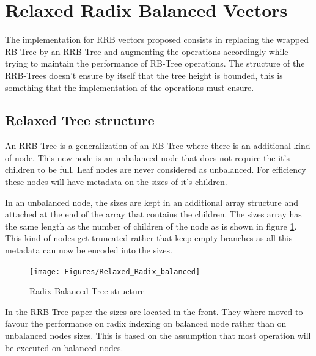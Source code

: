 \clearpage
\section{Relaxed Radix Balanced Vectors}

The implementation for RRB vectors proposed consists in replacing the wrapped RB-Tree by an RRB-Tree and augmenting the operations accordingly while trying to maintain the performance of RB-Tree operations. The structure of the RRB-Trees doesn't ensure by itself that the tree height is bounded, this is something that the implementation of the operations must ensure. 


\subsection{Relaxed Tree structure}
An RRB-Tree is a generalization of an RB-Tree where there is an additional kind of node. This new node is an unbalanced node that does not require the it's children to be full. Leaf nodes are never considered as unbalanced. For efficiency these nodes will have metadata on the sizes of it's children. 

In an unbalanced node, the sizes are kept in an additional array structure and attached at the end of the array that contains the children. The sizes array has the same length as the number of children of the node as is shown in figure \ref{Relaxed_Radix_balanced}. This kind of nodes get truncated rather that keep empty branches as all this metadata can now be encoded into the sizes.

\begin{figure}[h!]
  \centering
  \texttt{[image: Figures/Relaxed\_Radix\_balanced]}
  \caption{Radix Balanced Tree structure}
  \label{Relaxed_Radix_balanced}
\end{figure}

In the RRB-Tree paper \cite{RRBTrees} the sizes are located in the front. They where moved to favour the performance on radix indexing on balanced node rather than on unbalanced nodes sizes. This is based on the assumption that most operation will be executed on balanced nodes.

